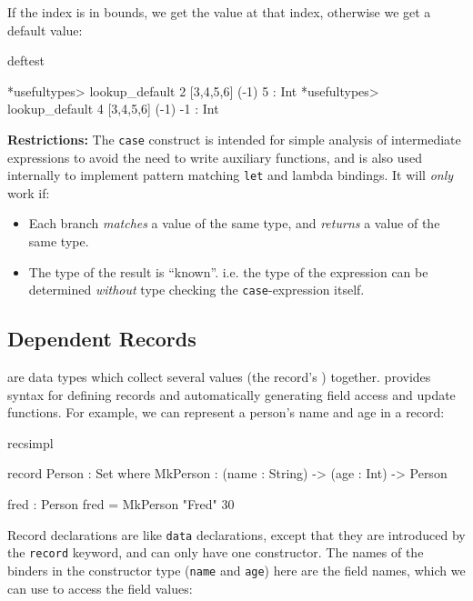 \noindent
If the index is in bounds, we get the value at that index, otherwise we get
a default value:

\begin{SaveVerbatim}{deftest}

*usefultypes> lookup_default 2 [3,4,5,6] (-1)
5 : Int
*usefultypes> lookup_default 4 [3,4,5,6] (-1)
-1 : Int

\end{SaveVerbatim}

\noindent
\textbf{Restrictions:} The \texttt{case} construct is intended for simple analysis
of intermediate expressions to avoid the need to write auxiliary functions, and is
also used internally to implement pattern matching \texttt{let} and lambda bindings. 
It will \emph{only} work if:

\begin{itemize}
\item Each branch \emph{matches} a value of the same type, and \emph{returns} a
value of the same type.
\item The type of the result is ``known''. i.e. the type of the expression can be
determined \emph{without} type checking the \texttt{case}-expression itself. 
\end{itemize}

\subsection{Dependent Records}

 are data types which collect several values (the record's
) together. \Idris{} provides syntax for defining records and
automatically generating field access and update functions. For example, we
can represent a person's name and age in a record:

\begin{SaveVerbatim}{recsimpl}

record Person : Set where
    MkPerson : (name : String) ->
               (age : Int) -> Person

fred : Person
fred = MkPerson "Fred" 30

\end{SaveVerbatim}

\noindent
Record declarations are like \texttt{data} declarations, except that they are 
introduced by the \texttt{record} keyword, and can only have one constructor.
The names of the binders in the constructor type (\texttt{name} and \texttt{age})
here are the field names, which we can use to access the field values:

